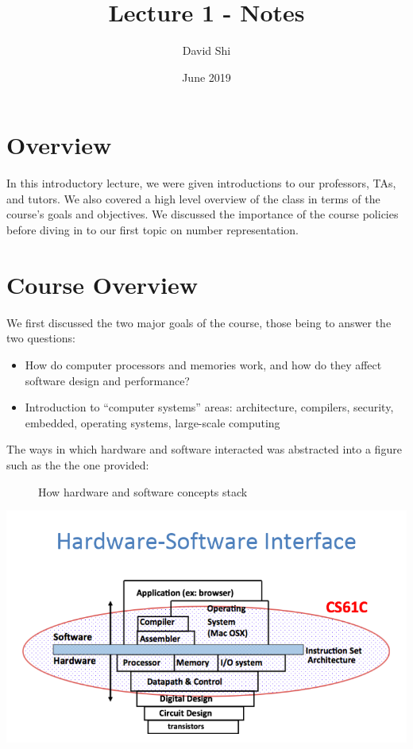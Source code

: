 \documentclass[letterpaper]{article}
\title{Lecture 1 - Notes}
\author{David Shi}
\date{June 2019}
\theoremstyle{remark}
\begin{document}
\maketitle

\section{Overview}

In this introductory lecture, we were given introductions to our professors, TAs, and tutors. We also covered a high level overview of the class in terms of the course's goals and objectives. We discussed the importance of the course policies before diving in to our first topic on number representation.

\section{Course Overview}

We first discussed the two major goals of the course, those being to answer the two questions:
\begin{itemize}
  \item How do computer processors and memories work, and how do they affect software design and performance?
  \item Introduction to “computer systems” areas: architecture, compilers, security, embedded, operating systems, large-scale computing
\end{itemize}
The ways in which hardware and software interacted was abstracted into a figure such as the the one provided:

\begin{figure}[t]
    \caption{How hardware and software concepts stack}
    \label{fig:my_label}
\end{figure}
\includegraphics[scale=.5]{Capture}
\end{document}
